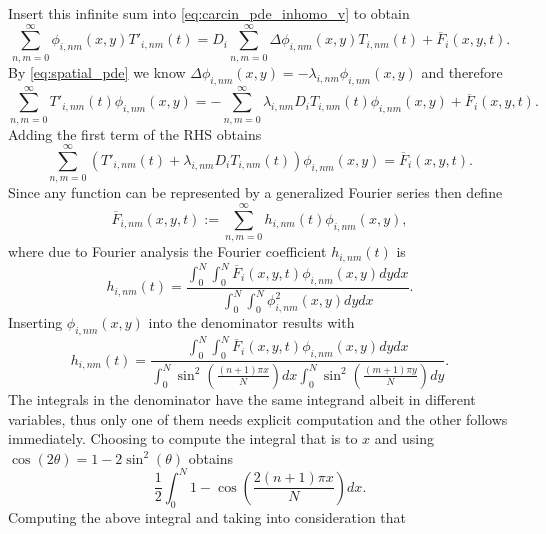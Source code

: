 \documentclass[\main/thesis.tex]{subfiles}
\begin{document}
Insert this infinite sum into \eqref{eq:carcin_pde_inhomo_v} to obtain 
\begin{equation*}
\sum_{n,m {=} 0}^{\infty} \phi_{i,nm}(x, y)T'_{i,nm}(t) {=} D_i \sum_{n,m {=} 0}^{\infty} \Delta \phi_{i,nm}(x, y) T_{i,nm}(t) {+} \overline{F}_i(x, y, t).
\end{equation*}
By \eqref{eq:spatial_pde} we know $\Delta \phi_{i,nm}(x, y) {=} \minus \lambda_{i,nm} \phi_{i,nm}(x, y)$ and therefore
\begin{equation*}
\sum_{n,m{=}0}^{\infty} T'_{i,nm}(t) \phi_{i,nm}(x, y) = {-}\sum_{n,m{=}0}^{\infty} \lambda_{i,nm} D_i T_{i,nm}(t) \phi_{i,nm}(x, y) {+} \overline{F}_i(x, y, t).
\end{equation*}
Adding the first term of the RHS obtains
\begin{equation}
\sum_{n,m{=}0}^{\infty} \left( T'_{i,nm}(t) {+} \lambda_{i,nm} D_i T_{i,nm}(t) \right)\phi_{i,nm}(x, y) {=} \overline{F}_i(x, y, t).
\label{eq:time_source_relation}
\end{equation} 
Since any function can be represented by a generalized Fourier series then define
\begin{equation*}
\overline{F}_{i,nm}(x, y, t) {:=} \sum_{n,m{=}0}^{\infty} h_{i,nm}(t) \phi_{i,nm}(x, y),
\end{equation*}
where due to Fourier analysis the Fourier coefficient $h_{i,nm}(t)$ is
\begin{equation*}
h_{i,nm}(t) {=} \frac{\int_{0}^{N} \int_{0}^{N} \overline{F}_i(x, y, t) \phi_{i,nm}(x, y) dy dx}{\int_{0}^{N} \int_{0}^{N} \phi_{i,nm}^2(x, y) dy dx}.
\end{equation*}
Inserting $\phi_{i,nm}(x, y)$ into the denominator results with
\begin{equation*}
h_{i,nm}(t) {=}
\frac{\int_{0}^{N} \int_{0}^{N} \overline{F}_i(x, y, t) \phi_{i,nm}(x, y) dy dx}{\int_{0}^{N} \sin^2\left( \frac{(n+1)\pi x}{N} \right) dx \int_{0}^{N} \sin^2\left( \frac{(m+1)\pi y}{N} \right) dy}.
\end{equation*}
The integrals in the denominator have the same integrand albeit in different variables, thus only one of them needs explicit computation and the other follows immediately. 
Choosing to compute the integral that is \wrt to $x$ and using $\cos(2 \theta) {=} 1 {-} 2\sin^2(\theta)$ obtains 
\begin{equation*}
\frac{1}{2} \int_{0}^{N} 1 {-} \cos \left( \frac{2(n+1)\pi x}{N} \right) dx.
\end{equation*} 
Computing the above integral and taking into consideration that \newline
\end{document}

